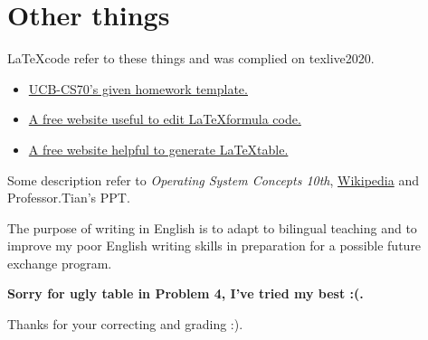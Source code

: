 \documentclass[11pt]{article}
\begin{document}
\section*{Other things}

    \LaTeX \space code refer to these things and was complied on texlive2020.
    \begin{itemize}
        \item  \href{https://www.eecs70.org/assets/misc/homework_template.tex}{UCB-CS70's given homework template.} 
        \item  \href{https://www.latexlive.com}{A free website useful to edit \LaTeX \space formula code.}
        \item  \href{https://www.tablesgenerator.com/}{A free website helpful to generate \LaTeX \space table.}
    \end{itemize}

    Some description refer to \textit{Operating System Concepts 10th}, \href{https://en.wikipedia.org}{Wikipedia} and Professor.Tian's PPT.

    The purpose of writing in English is to adapt to bilingual teaching and to improve my poor English 
    writing skills in preparation for a possible future exchange program. 

    \textbf{Sorry for ugly table in Problem 4, I've tried my best :(.}

    Thanks for your correcting and grading :).
\end{document}
